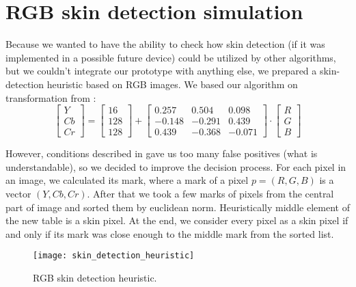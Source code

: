     \section{RGB skin detection simulation}
        Because we wanted to have the ability to check how skin detection
        (if it was implemented in a possible future device) could be utilized
        by other algorithms, but we couldn't integrate our prototype with
        anything else, we prepared a skin-detection heuristic based on RGB images.
        We based our algorithm on transformation from \cite{toyotaskin}:
        \[
            \begin{bmatrix}
                Y \\
                Cb \\
                Cr
            \end{bmatrix}
            =
            \begin{bmatrix}
                16\\
                128\\
                128
            \end{bmatrix}
            +
             \begin{bmatrix}
                 0.257  &  0.504        &  0.098 \\
                -0.148  & -0.291        &  0.439 \\
                 0.439  & -0.368        & -0.071
            \end{bmatrix}
            \cdot
             \begin{bmatrix}
                R\\
                G\\
                B
            \end{bmatrix}
        \]

        However, conditions described in \cite{toyotaskin} gave us too many false positives
        (what is understandable), so we decided to improve the decision process.
        For each pixel in an image, we calculated its mark, where a mark of a pixel
        $p = (R, G, B)$ is a vector $(Y, Cb, Cr)$.
        After that we took a few marks of pixels from the central part of image and
        sorted them by euclidean norm.
        Heuristically middle element of the new table is a skin pixel.
        At the end, we consider every pixel as a skin pixel if and only if
        its mark was close enough to the middle mark from the sorted list.

        \begin{figure}[H]
            \caption{RGB skin detection heuristic.}
            \centering
            \texttt{[image: skin\_detection\_heuristic]}
            \label{fig:skin_detection_heuristic}
        \end{figure}
